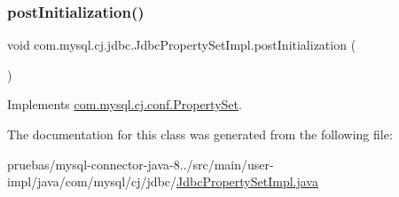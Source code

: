 \subsubsection{\texorpdfstring{post\+Initialization()}{postInitialization()}}
{\footnotesize\ttfamily void com.\+mysql.\+cj.\+jdbc.\+Jdbc\+Property\+Set\+Impl.\+post\+Initialization (\begin{DoxyParamCaption}{ }\end{DoxyParamCaption})}



Implements \mbox{\hyperlink{interfacecom_1_1mysql_1_1cj_1_1conf_1_1_property_set_a1e590d8f29a11f3231099aa1c163f987}{com.\+mysql.\+cj.\+conf.\+Property\+Set}}.



The documentation for this class was generated from the following file\+:\begin{DoxyCompactItemize}
\item 
pruebas/mysql-\/connector-\/java-\/8../src/main/user-\/impl/java/com/mysql/cj/jdbc/\mbox{\hyperlink{_jdbc_property_set_impl_8java}{Jdbc\+Property\+Set\+Impl.\+java}}\end{DoxyCompactItemize}
